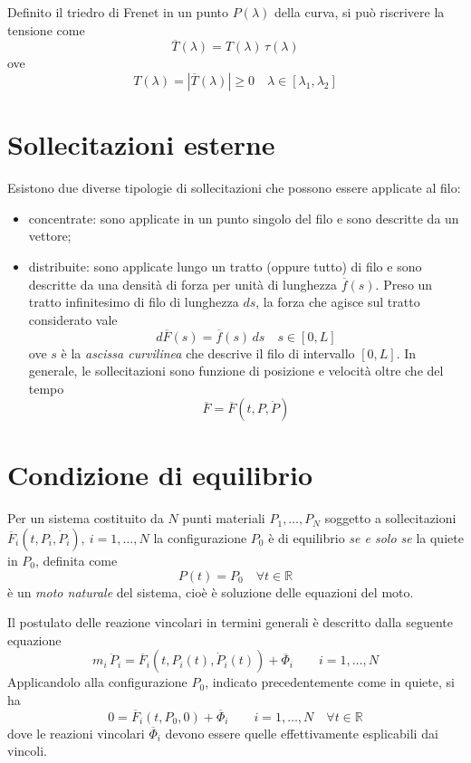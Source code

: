 Definito il triedro di Frenet in un punto $P(\lambda)$ della curva, si può riscrivere la tensione come
\[
	\overline{T}(\lambda) = T(\lambda)\,\hat{\tau}(\lambda)
\]
ove
\[
T(\lambda) = \left|\overline{T}(\lambda)\right|\geq 0 \quad \lambda\in[\lambda_1, \lambda_2]
\]

\section{Sollecitazioni esterne}
Esistono due diverse tipologie di sollecitazioni che possono essere applicate al filo:
\begin{itemize}
	\item concentrate: sono applicate in un punto singolo del filo e sono descritte da un vettore;
	\item distribuite: sono applicate lungo un tratto (oppure tutto) di filo e sono descritte da una densità di forza per unità di lunghezza $\overline{f}(s)$. Preso un tratto infinitesimo di filo di lunghezza $ds$, la forza che agisce sul tratto considerato vale
	\[
		d\overline{F}(s) = \overline{f}(s)\,ds \quad s\in[0,L]
	\]
	ove $s$ è la \emph{ascissa curvilinea} che descrive il filo di intervallo $[0,L]$.
	In generale, le sollecitazioni sono funzione di posizione e velocità oltre che del tempo
	\[
	\overline{F} = \overline{F}(t, P, \dot{P})
	\]
\end{itemize}

\section{Condizione di equilibrio}
Per un sistema costituito da $N$ punti materiali ${P_1, \dots, P_N}$ soggetto a sollecitazioni $\overline{F}_i (t, P_i, \dot{P}_i),~ i=1,\dots,N$ la configurazione $P_0$ è di equilibrio \emph{se e solo se} la quiete in $P_0$, definita come
\[
P(t) = P_0\quad \forall t\in\mathbb{R}
\]
è un \emph{moto naturale} del sistema, cioè è soluzione delle equazioni del moto.

Il postulato delle reazione vincolari in termini generali è descritto dalla seguente equazione
\[
m_i\,\ddot{P}_i = \overline{F}_i(t,P_i(t), \dot{P}_i(t)) + \overline{\Phi}_i\qquad i=1,\dots,N
\]
Applicandolo alla configurazione $P_0$, indicato precedentemente come in quiete, si ha
\begin{equation}
	\label{eq:equilibrio_p0}
	0 = \overline{F}_i (t, P_0, 0) + \overline{\Phi}_i\qquad i = 1,\dots, N\quad\forall t\in\mathbb{R}
\end{equation}
dove le reazioni vincolari $\overline{\Phi}_i$ devono essere quelle effettivamente esplicabili dai vincoli.

